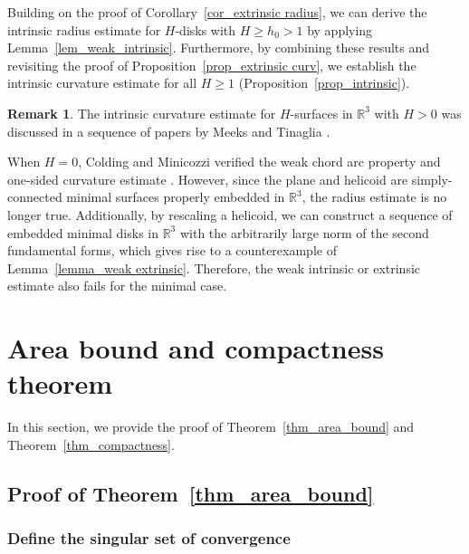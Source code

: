 \documentclass[12pt,a4paper]{amsart}
\numberwithin{equation}{section}
\theoremstyle{plain}
\theoremstyle{named}
\theoremstyle{definition}
\newtheorem{Rem}[Th]{Remark}
\begin{document}
Building on the proof of Corollary~\ref{cor_extrinsic radius}, we can derive the intrinsic radius estimate for $H$-disks with $H \geq h_0 > 1$ by applying Lemma~\ref{lem_weak_intrinsic}. Furthermore, by combining these results and revisiting the proof of Proposition~\ref{prop_extrinsic curv}, we establish the intrinsic curvature estimate for all $H\geq 1$ (Proposition~\ref{prop_intrinsic}).


\begin{Rem}
   The intrinsic curvature estimate for $H$-surfaces in $\mathbb{R}^3$ with $H>0$ was discussed in a sequence of papers by Meeks and Tinaglia \cite{Meeks-Tinaglia_Delaunay}\cite{Meeks-Tinaglia_chord_arc}\cite{Meeks-Tinaglia_curv_est}\cite{Meeks-Tinaglia_limit_lamination}. 

   When $H=0$, Colding and Minicozzi verified the weak chord arc property \cite{Colding-Minicozzi_chord} and one-sided curvature estimate \cite{Colding-Minicozzi_1-sided}. However, since the plane and helicoid are simply-connected minimal surfaces properly embedded in $\mathbb{R}^3$, the radius estimate is no longer true. Additionally, by rescaling a helicoid, we can construct a sequence of embedded minimal disks in $\mathbb{R}^3$ with the arbitrarily large norm of the second fundamental forms, which gives rise to a counterexample of Lemma~\ref{lemma_weak extrinsic}. Therefore, 
   the weak intrinsic or extrinsic estimate also fails for the minimal case.
\end{Rem}





\section{Area bound and compactness theorem}\label{section_area_compactness}
In this section, we provide the proof of Theorem~\ref{thm_area_bound} and Theorem~\ref{thm_compactness}. 
\subsection{Proof of Theorem~\ref{thm_area_bound}}
    \subsubsection{Define the singular set of convergence}
    
\end{document}
